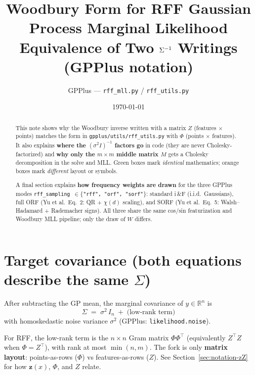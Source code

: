 \documentclass[11pt]{article}
\title{Woodbury Form for RFF Gaussian Process Marginal Likelihood\\[0.4em]
\large Equivalence of Two $\Sig^{-1}$ Writings (GPPlus notation)}
\author{GPPlus --- \texttt{rff\_mll.py} / \texttt{rff\_utils.py}}
\date{\today}
\newcommand{\noise}{\sigma^2}
\newcommand{\Sig}{\Sigma}
\newcommand{\Ph}{\Phi}
\newcommand{\Zmat}{Z}
\begin{document}
\maketitle

\begin{abstract}
This note shows why the Woodbury inverse written with a matrix $\Zmat$ (features $\times$ points)
matches the form in \texttt{gpplus/utils/rff\_utils.py} with $\Ph$ (points $\times$ features).
It also explains \textbf{where the $(\noise I)^{-1}$ factors go} in code (they are never Cholesky-factorized)
and \textbf{why only the $m\times m$ middle matrix $M$} gets a Cholesky decomposition in the solve and MLL.
Green boxes mark \emph{identical} mathematics; orange boxes mark \emph{different} layout or symbols.

A final section explains \textbf{how frequency weights are drawn} for the three GPPlus modes
\texttt{rff\_sampling $\in \{$\texttt{"rff"}, \texttt{"orf"}, \texttt{"sorf"}$\}$}:
standard i\,\&\!F (i.i.d.\ Gaussians), full ORF (Yu et al.\ Eq.~2: QR + $\chi(d)$ scaling), and
SORF (Yu et al.\ Eq.~5: Walsh--Hadamard + Rademacher signs).
All three share the same cos/sin featurization and Woodbury MLL pipeline; only the draw of $W$ differs.
\end{abstract}

\tableofcontents
\newpage

\section{Target covariance (both equations describe the same $\Sig$)}

After subtracting the GP mean, the marginal covariance of $y\in\mathbb{R}^n$ is
\begin{equation}
  \label{eq:sigma}
  \boxed{\;
    \Sig \;=\; \noise\, I_n \;+\; \text{(low-rank term)}
  \;}
\end{equation}
with homoskedastic noise variance $\noise$ (GPPlus: \texttt{likelihood.noise}).

For RFF, the low-rank term is the $n\times n$ Gram matrix $\Ph\Ph^{\top}$ (equivalently $\Zmat^{\top}\Zmat$ when $\Ph=\Zmat^{\top}$), with rank at most $\min(n,m)$.
The fork is only \textbf{matrix layout}: points-as-rows ($\Ph$) vs features-as-rows ($\Zmat$).
See Section~\ref{sec:notation-zZ} for how $\mathbf z(x)$, $\Ph$, and $\Zmat$ relate.
\end{document}
